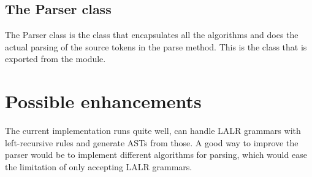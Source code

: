 \subsection{The Parser class}
The Parser class is the class that encapsulates all the algorithms and does the actual parsing of the source tokens in the parse method. This is the class that is exported from the module.
\section{Possible enhancements}
The current implementation runs quite well, can handle LALR grammars with left-recursive rules and generate ASTs from those.
A good way to improve the parser would be to implement different algorithms for parsing, which would ease the limitation of only accepting LALR grammars.